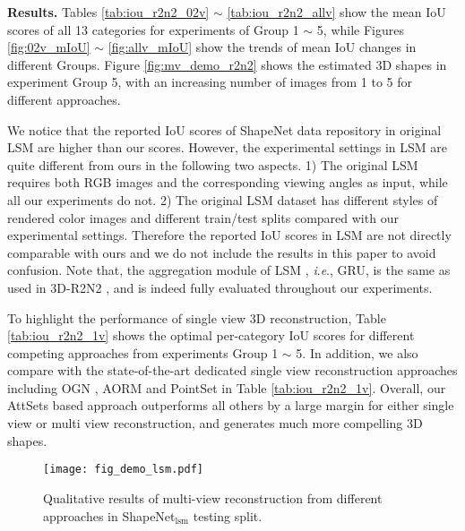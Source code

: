 \documentclass[twocolumn]{svjour3}    \pdfoutput=1
\newcommand{\nickname}{AttSets}
\newcommand{\ie}{\textit{i}.\textit{e}., }
\begin{document}
\textbf{Results.} Tables \ref{tab:iou_r2n2_02v} $\sim$ \ref{tab:iou_r2n2_allv} show the mean IoU scores of all 13 categories for experiments of Group 1 $\sim$ 5, while Figures \ref{fig:02v_mIoU} $\sim$ \ref{fig:allv_mIoU} show the trends of mean IoU changes in different Groups. Figure \ref{fig:mv_demo_r2n2} shows the estimated 3D shapes in experiment Group 5, with an increasing number of images from 1 to 5 for different approaches. 

We notice that the reported IoU scores of ShapeNet data repository in original LSM \citep{Kar2017} are higher than our scores. However, the experimental settings in LSM \citep{Kar2017} are quite different from ours in the following two aspects. 1) The original LSM requires both RGB images and the corresponding viewing angles as input, while all our experiments do not. 2) The original LSM dataset has different styles of rendered color images and different train/test splits compared with our experimental settings. Therefore the reported IoU scores in LSM are not directly comparable with ours and we do not include the results in this paper to avoid confusion. Note that, the aggregation module of LSM \citep{Kar2017}, \ie GRU, is the same as used in 3D-R2N2 \citep{Chan2016}, and is indeed fully evaluated throughout our experiments.

To highlight the performance of single view 3D reconstruction, Table \ref{tab:iou_r2n2_1v} shows the optimal per-category IoU scores for different competing approaches from experiments Group 1 $\sim$ 5. In addition, we also compare with the state-of-the-art dedicated single view reconstruction approaches including OGN \citep{Tatarchenko2017}, AORM \citep{Yang2018c} and PointSet \citep{Fan2017} in Table \ref{tab:iou_r2n2_1v}. Overall, our \nickname{} based approach outperforms all others by a large margin for either single view or multi view reconstruction, and generates much more compelling 3D shapes.

\begin{figure*}[h]
\centering
   \texttt{[image: fig\_demo\_lsm.pdf]}
\caption{Qualitative results of multi-view reconstruction from different approaches in ShapeNet$_{\textrm{lsm}}$ testing split.}
\label{fig:mv_demo_lsm}
\vspace{-0.35cm}
\end{figure*}
\end{document}
